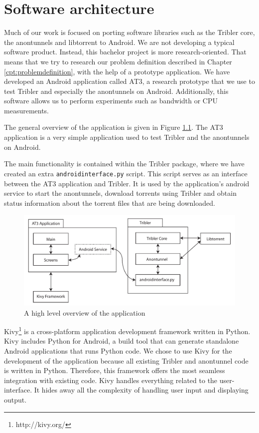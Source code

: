 \chapter{Software architecture}
\label{cpt:softwarearchitecture}
Much of our work is focused on porting software libraries such as the Tribler core, the anontunnels and libtorrent to Android. We are not developing a typical software product. Instead, this bachelor project is more research-oriented. That means that we try to research our problem definition described in Chapter \ref{cpt:problemdefinition}, with the help of a prototype application. We have developed an Android application called AT3, a research prototype that we use to test Tribler and especially the anontunnels on Android. Additionally, this software allows us to perform experiments such as bandwidth or CPU measurements.

The general overview of the application is given in Figure \ref{fig:overview}. The AT3 application is a very simple application used to test Tribler and the anontunnels on Android.

The main functionality is contained within the Tribler package, where we have created an extra \texttt{androidinterface.py} script. This script serves as an interface between the AT3 application and Tribler. It is used by the application's android service to start the anontunnels, download torrents using Tribler and obtain status information about the torrent files that are being downloaded. 

\begin{figure}[!h]
	\centering
	\includegraphics[width=\textwidth]{graphics/overview.pdf}
	\caption{A high level overview of the application}
	\label{fig:overview}
\end{figure}

Kivy\footnote{http://kivy.org/} is a cross-platform application development framework written in Python. Kivy includes Python for Android, a build tool that can generate standalone Android applications that runs Python code. We chose to use Kivy for the development of the application because all existing Tribler and anontunnel code is written in Python. Therefore, this framework offers the most seamless integration with existing code. Kivy handles everything related to the user-interface. It hides away all the complexity of handling user input and displaying output.

